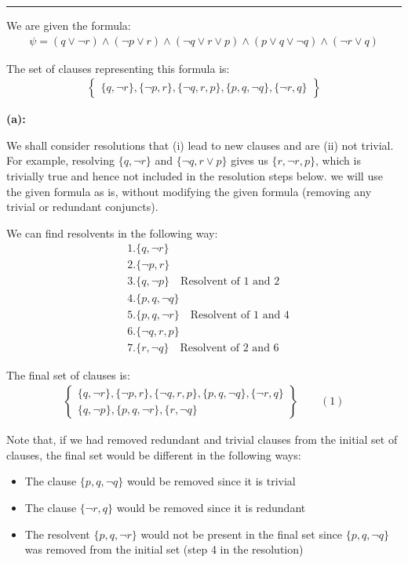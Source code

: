 \documentclass[12pt,letterpaper, onecolumn]{exam}
\begin{document}
\begin{questions}
    {\rule{17cm}{0.4pt}}
	\question[]
	\solutiontitle

	We are given the formula:
	\begin{align*}
		\psi = (q \lor \neg r) \land (\neg p \lor r) \land (\neg q \lor r \lor p) \land (p \lor q \lor \neg q) \land (\neg r \lor q)
	\end{align*}

	The set of clauses representing this formula is:
	\begin{align*}
		\left .
			\begin{cases}
				\{q, \neg r\}, \{\neg p, r\}, \{\neg q, r, p\}, \{p, q, \neg q\}, \{\neg r, q\}
			\end{cases}
		\right\}
	\end{align*}

	\textbf{(a):}

	We shall consider resolutions that (i) lead to new clauses and are (ii) not trivial. 
	For example, resolving $\{q, \neg r \}$ and $\{ \neg q, r \lor p \}$ gives us $\{ r, \neg r, p \}$, which is trivially true and hence not included
	in the resolution steps below. we will use the given formula as is, without modifying the given formula (removing any trivial or redundant conjuncts).  
	
	We can find resolvents in the following way:
	\begin{align*}
		& 1. \{ q, \neg r \} \\
		& 2. \{ \neg p, r \} \\
		& 3. \{ q, \neg p \} \quad \text{Resolvent of 1 and 2} \\
		& 4. \{ p, q, \neg q \} \\
		& 5. \{ p, q, \neg r \} \quad \text{Resolvent of 1 and 4} \\
		& 6. \{ \neg q, r, p \} \\
		& 7. \{ r, \neg q \} \quad \text{Resolvent of 2 and 6}
	\end{align*}

	The final set of clauses is:
	\begin{align*}
		\left .
			\begin{cases}
				\{q, \neg r\}, \{\neg p, r\}, \{\neg q, r, p\}, \{p, q, \neg q\}, \{\neg r, q\} \\
				\{ q, \neg p \}, \{ p, q, \neg r \}, \{ r, \neg q \}
			\end{cases}
		\right\} \quad \quad (1) \label{set1}
	\end{align*}

	Note that, if we had removed redundant and trivial clauses from the initial set of clauses, the final set would be different in the following ways:
	\begin{itemize}
		\item The clause $\{ p, q, \neg q \} $ would be removed since it is trivial
		\item The clause $\{ \neg r, q \}$ would be removed since it is redundant
		\item The resolvent $ \{ p, q, \neg r \} $ would not be present in the final set since $\{ p, q, \neg q \} $ was removed from the initial set (step 4 in the resolution)
	\end{itemize}


\end{questions}
\end{document}
